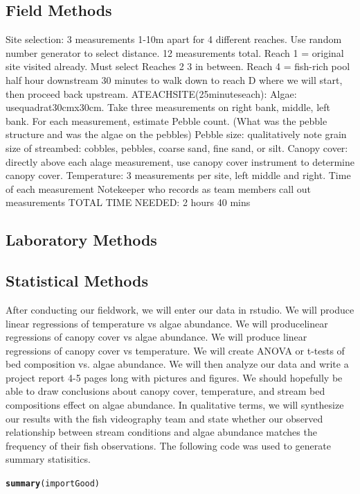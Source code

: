 \documentclass{article}\usepackage[]{graphicx}\usepackage[]{color}
\makeatletter
\newcommand{\hlstd}[1]{\textcolor[rgb]{0.345,0.345,0.345}{#1}}%
\newcommand{\hlkwd}[1]{\textcolor[rgb]{0.737,0.353,0.396}{\textbf{#1}}}%
\newenvironment{kframe}{%
 \def\at@end@of@kframe{}%
 \ifinner\ifhmode%
  \def\at@end@of@kframe{\end{minipage}}%
  \begin{minipage}{\columnwidth}%
 \fi\fi%
 \def\FrameCommand##1{\hskip\@totalleftmargin \hskip-\fboxsep
 \colorbox{shadecolor}{##1}\hskip-\fboxsep
     \hskip-\linewidth \hskip-\@totalleftmargin \hskip\columnwidth}%
 \MakeFramed {\advance\hsize-\width
   \@totalleftmargin\z@ \linewidth\hsize
   \@setminipage}}%
 {\par\unskip\endMakeFramed%
 \at@end@of@kframe}
\newenvironment{knitrout}{}{} %
\makeatother
\begin{document}
\subsection{Field Methods}
Site selection: 3 measurements 1-10m apart for 4 diﬀerent reaches. Use random number generator to select distance. 12 measurements total. Reach 1 = original site visited already. Must select Reaches 2 3 in between. Reach 4 = ﬁsh-rich pool half hour downstream 30 minutes to walk down to reach D where we will start, then proceed back upstream. ATEACHSITE(25minuteseach): Algae: usequadrat30cmx30cm. Take three measurements on right bank, middle, left bank. For each measurement, estimate Pebble count. (What was the pebble structure and was the algae on the pebbles) Pebble size: qualitatively note grain size of streambed: cobbles, pebbles, coarse sand, ﬁne sand, or silt. Canopy cover: directly above each alage measurement, use canopy cover instrument to determine canopy cover. Temperature: 3 measurements per site, left middle and right. Time of each measurement Notekeeper who records as team members call out measurements TOTAL TIME NEEDED: 2 hours 40 mins
\subsection{Laboratory Methods}

\subsection{Statistical Methods}
After conducting our ﬁeldwork, we will enter our data in rstudio. We will produce linear regressions of temperature vs algae abundance. We will producelinear regressions of canopy cover vs algae abundance. We will produce linear regressions of canopy cover vs temperature. We will create ANOVA or t-tests of bed composition vs. algae abundance. We will then analyze our data and write a project report 4-5 pages long with pictures and ﬁgures. We should hopefully be able to draw conclusions about canopy cover, temperature, and stream bed compositions eﬀect on algae abundance. In qualitative terms, we will synthesize our results with the ﬁsh videography team and state whether our observed relationship between stream conditions and algae abundance matches the frequency of their ﬁsh observations.
The following code was used to generate summary statisitics. 
\begin{knitrout}
\color{fgcolor}\begin{kframe}
\begin{alltt}
\hlkwd{summary}\hlstd{(importGood)}
\end{alltt}


{\ttfamily\noindent\bfseries\color{errorcolor}{\#\# Error in summary(importGood): object 'importGood' not found}}\end{kframe}
\end{knitrout}
\end{document}
